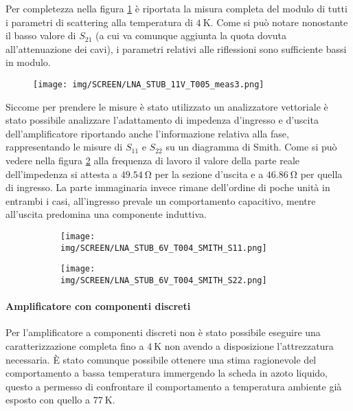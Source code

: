 \documentclass[12pt,oneside]{book}
\begin{document}
Per completezza nella figura \ref{cryo_stub_all} è riportata la misura completa del modulo di tutti i parametri di scattering alla temperatura di $\SI{4}{\kelvin}$. Come si può notare nonostante il basso valore di $S_{21}$ (a cui va comunque aggiunta la quota dovuta all'attenuazione dei cavi), i parametri relativi alle riflessioni sono sufficiente bassi in modulo.

\begin{figure}[!htbp]
    \centering
        \texttt{[image: img/SCREEN/LNA\_STUB\_11V\_T005\_meas3.png]}
    \caption{}
    \label{cryo_stub_all}
\end{figure}

Siccome per prendere le misure è stato utilizzato un analizzatore vettoriale è stato possibile analizzare l'adattamento di impedenza d'ingresso e d'uscita dell'amplificatore riportando anche l'informazione relativa alla fase, rappresentando le misure di $S_{11}$ e $S_{22}$ su un diagramma di Smith.
Come si può vedere nella figura \ref{smith_plot_cryo} alla frequenza di lavoro il valore della parte reale dell'impedenza si attesta a $\SI{49.54}{\ohm}$ per la sezione d'uscita e a $\SI{46.86}{\ohm}$ per quella di ingresso. La parte immaginaria invece rimane dell'ordine di poche unità in entrambi i casi, all'ingresso prevale un comportamento capacitivo, mentre all'uscita predomina una componente induttiva.

\begin{figure}[!htbp]
    \centering
    \begin{subfigure}[t]{0.49\textwidth}
        \centering
        \texttt{[image: img/SCREEN/LNA\_STUB\_6V\_T004\_SMITH\_S11.png]}
        \caption{}
    \end{subfigure}
    \hfill
    \begin{subfigure}[t]{0.49\textwidth}
        \centering
        \texttt{[image: img/SCREEN/LNA\_STUB\_6V\_T004\_SMITH\_S22.png]}
        \caption{}
    \end{subfigure}
    \caption{}
    \label{smith_plot_cryo}
\end{figure}

\paragraph{Amplificatore con componenti discreti}

Per l'amplificatore a componenti discreti non è stato possibile eseguire una caratterizzazione completa fino a $\SI{4}{\kelvin}$ non avendo a disposizione l'attrezzatura necessaria. È stato comunque possibile ottenere una stima ragionevole del comportamento a bassa temperatura immergendo la scheda in azoto liquido, questo a permesso di confrontare il comportamento a temperatura ambiente già esposto con quello a $\SI{77}{\kelvin}$.
\end{document}
